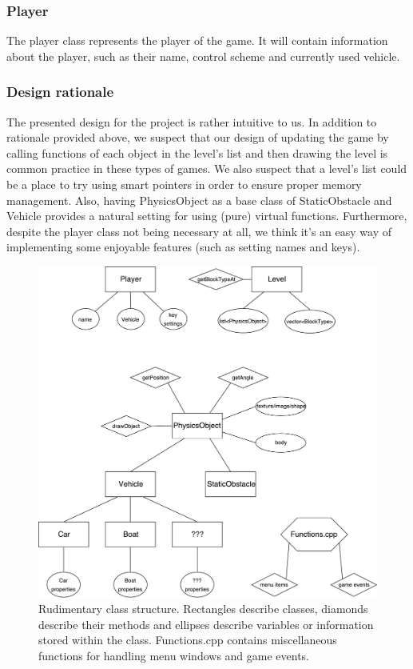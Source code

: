 \documentclass{article}
\begin{document}
\subsubsection*{Player}
The player class represents the player of the game. It will contain information about the player, such as their name, control scheme and currently used vehicle.

\subsubsection*{Design rationale}
The presented design for the project is rather intuitive to us. In addition to rationale provided above, we suspect that our design of updating the game by calling functions of each object in the level's list and then drawing the level is common practice in these types of games. We also suspect that a level's list could be a place to try using smart pointers in order to ensure proper memory management. Also, having PhysicsObject as a base class of StaticObstacle and Vehicle provides a natural setting for using (pure) virtual functions. Furthermore, despite the player class not being necessary at all, we think it's an easy way of implementing some enjoyable features (such as setting names and keys).

\newpage
\begin{figure}[!ht]
\centering
\includegraphics[width=\textwidth]{classes.pdf}
\caption{Rudimentary class structure. Rectangles describe classes, diamonds describe their methods and ellipses describe variables or information stored within the class. Functions.cpp contains miscellaneous functions for handling menu windows and game events.}
\end{figure}
\end{document}

